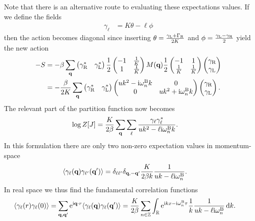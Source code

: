 \documentclass[english, parskip=full]{scrartcl}
\begin{document}
Note that there is an alternative route to evaluating these expectations values.
If we define the fields 
\begin{align}
\gamma_\ell &= K\theta - \ell \phi
\end{align}
then the action becomes diagonal since inserting $\theta = \frac{\gamma_\L + \Gamma_\R}{2K}$ and $\phi = \frac{\gamma_\L - \gamma_\R}{2}$ yield the new action
\begin{align}
-S &= -\beta \sum_\textbf{q} \begin{pmatrix}
\gamma_\R^\ast & \gamma_\L^\ast
\end{pmatrix} \frac{1}{2} \begin{pmatrix}
-1& \frac{1}{K} \\ 1 & \frac{1}{K}
\end{pmatrix} M(\textbf{q}) \frac{1}{2} \begin{pmatrix}
-1&1 \\ \frac{1}{K} & \frac{1}{K}
\end{pmatrix} \begin{pmatrix}
\gamma_\R \\ \gamma_\L
\end{pmatrix} \\
&= -\frac{\beta}{2K} \sum_\textbf{q} \begin{pmatrix}
\gamma_\R^\ast & \gamma_\L^\ast
\end{pmatrix} \begin{pmatrix}
uk^2 - \i\omega_n^\B k & 0 \\ 0 & uk^2 + \i\omega_n^\B k
\end{pmatrix} \begin{pmatrix}
\gamma_\R \\ \gamma_\L
\end{pmatrix}.
\end{align}
The relevant part of the partition function now becomes
\begin{align}
\log Z[J] &= \frac{K}{2\beta} \sum_\textbf{q} \sum_\ell \frac{\gamma_\ell\gamma_\ell^\ast}{uk^2 - \ell\i\omega_n^\B k}.
\end{align}
In this formulation there are only two non-zero expectation values in momentum-space
\begin{align}
\bra*{\gamma_\ell(\textbf{q}) \gamma_{\ell'}(\textbf{q}')} &= \delta_{\ell\ell'} \delta_{\textbf{q},-\textbf{q}'} \frac{K}{2\beta k} \frac{1}{uk - \ell\i\omega_n^\B}.
\end{align}
In real space we thus find the fundamental correlation functions
\begin{align}
\bra*{\gamma_\ell(r) \gamma_{\ell}(0)} &= \sum_{\textbf{q},\textbf{q}'} \powe{\i \textbf{q}\cdot r} \bra*{\gamma_\ell(\textbf{q}) \gamma_\ell(\textbf{q}')} = \frac{K}{2\beta} \sum_{n\in\mathbb{Z}} \intr{\powe{\i kx - \i\omega_n^\B\tau} \frac{1}{k} \frac{1}{uk - \ell\i\omega_n^\B}}{k}.
\end{align}
\end{document}
